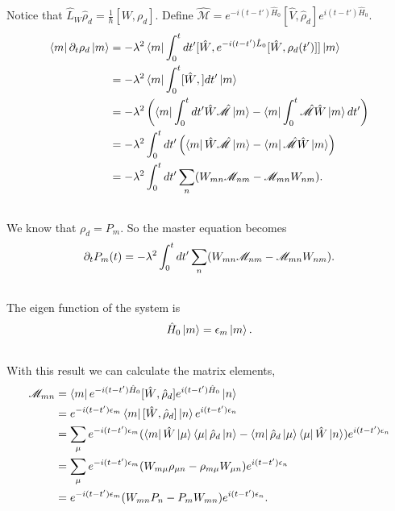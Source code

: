 \documentclass[letterpaper,10pt,english]{sphinxmanual}
\newcommand{\bra}[1]{\left\langle #1\right|}
\newcommand{\ket}[1]{\left| #1\right\rangle}
\begin{document}
Notice that $\hat L_W \hat \rho_d = \frac{1}{\hbar}[W, \rho_d]$. Define $\hat{\mathscr M} = e^{-i(t-t')\hat H_0}[\hat V,\hat \rho_d]e^{i(t-t')\hat H_0}$.
\begin{gather}
\begin{split}\bra{m} \partial_t \rho_d \ket{m} &= -\lambda^2 \bra{m} \int_0^t dt' [\hat W, e^{-i(t-t')\hat L_0}[\hat W, \rho_d(t')]] \ket{m}  \\
& = -\lambda^2 \bra{m} \int_0^t [\hat W, ] dt' \ket{m}  \\
& = -\lambda^2 \left( \bra{m} \int_0^t dt' \hat W\hat{\mathscr M} \ket{m} - \bra{m} \int_0^t \hat{\mathscr M}\hat W\ket{m} dt' \right) \\
& = -\lambda^2 \int_0^t dt' \left( \bra{m} \hat W\hat{\mathscr M} \ket{m} - \bra{m} \hat{\mathscr M}\hat W\ket{m}  \right) \\
& = -\lambda^2 \int_0^t dt' \sum_n (W_{mn}\mathscr M_{nm} - \mathscr M_{mn}W_{nm}).\end{split}\notag\\\begin{split}\end{split}\notag
\end{gather}
We know that $\rho_d = P_{m}$. So the master equation becomes
\begin{gather}
\begin{split}\partial_t P_m(t) = -\lambda^2 \int_0^t dt' \sum_n (W_{mn}\mathscr M_{nm} - \mathscr M_{mn}W_{nm}).\end{split}\notag\\\begin{split}\end{split}\notag
\end{gather}
The eigen function of the system is
\begin{gather}
\begin{split}\hat H_0 \ket{m} = \epsilon_m \ket{m} .\end{split}\notag\\\begin{split}\end{split}\notag
\end{gather}
With this result we can calculate the matrix elements,
\begin{gather}
\begin{split}\mathscr M_{mn} &= \bra{m} e^{-i(t-t')\hat H_0}[\hat W,\hat \rho_d]e^{i(t-t')\hat H_0} \ket{n} \\
& = e^{-i(t-t')\epsilon_m} \bra{m} [\hat W, \hat \rho_d] \ket{n} e^{i(t-t')\epsilon_n} \\
& = \sum_\mu e^{-i(t-t')\epsilon_m} (\bra{m} \hat W \ket{\mu} \bra{\mu} \hat \rho_d \ket{n} - \bra{m} \hat \rho_d \ket{\mu}\bra{\mu} \hat W \ket{n} )e^{i(t-t')\epsilon_n} \\
& = \sum_\mu  e^{-i(t-t')\epsilon_m} (W_{m\mu}\rho_{\mu n} - \rho_{m\mu}W_{\mu n}) e^{i(t-t')\epsilon_n} \\
& = e^{-i(t-t')\epsilon_m} ( W_{mn}P_{n} - P_{m}W_{m n} ) e^{i(t-t')\epsilon_n} .\end{split}\notag\\\begin{split}\end{split}\notag
\end{gather}
\end{document}
